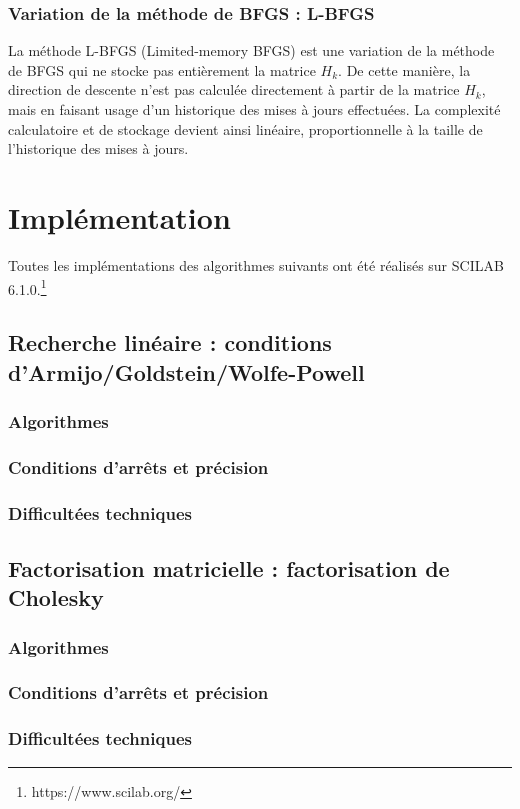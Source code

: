 \documentclass[3p, twocolumn]{elsarticle}
\begin{document}
\subsubsection{Variation de la méthode de BFGS : L-BFGS}
La méthode L-BFGS (Limited-memory BFGS) est une variation de la méthode de BFGS qui ne stocke pas entièrement la matrice $H_k$. De cette manière, la direction de descente n'est pas calculée directement à partir de la matrice $H_k$, mais en faisant usage d'un historique des mises à jours effectuées. La complexité calculatoire et de stockage devient ainsi linéaire, proportionnelle à la taille de l'historique des mises à jours. 

\section{Implémentation}
Toutes les implémentations des algorithmes suivants ont été réalisés sur SCILAB 6.1.0.\footnote{https://www.scilab.org/}
\subsection{Recherche linéaire : conditions d'Armijo/Goldstein/Wolfe-Powell}
\subsubsection{Algorithmes}
\subsubsection{Conditions d'arrêts et précision}
\subsubsection{Difficultées techniques}
\subsection{Factorisation matricielle : factorisation de Cholesky}
\subsubsection{Algorithmes}
\subsubsection{Conditions d'arrêts et précision}
\subsubsection{Difficultées techniques}
\end{document}
